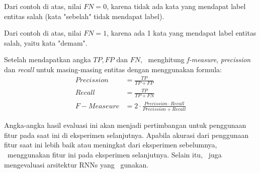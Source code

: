 \begin{enumerate}

	Dari contoh di atas, nilai $ FN = 0 $, karena tidak ada kata yang mendapat label entitas salah (kata "sebelah" tidak mendapat label).
	

	Dari contoh di atas, nilai $ FN = 1 $, karena ada 1 kata yang mendapat label entitas salah, yaitu kata "demam".
	
\end{enumerate}
	
Setelah mendapatkan angka $ TP, FP $ dan $ FN $, \saya~menghitung \textit{f-measure}, \textit{precission} dan \textit{recall} untuk masing-masing entitas dengan menggunakan formula:
\begin{align}
	Precission &= \frac{TP}{TP+FP}\\
	Recall &= \frac{TP}{TP+FN}\\
	F-Measeure &= 2 \cdot \frac{Precission \cdot Recall}{Precission + Recall}
\end{align}

Angka-angka hasil evaluasi ini akan menjadi pertimbangan untuk penggunaan fitur pada saat ini di eksperimen selanjutnya. Apabila akurasi dari penggunaan fitur saat ini lebih baik atau meningkat dari eksperimen sebelumnya, \saya~menggunakan fitur ini pada eksperimen selanjutnya. Selain itu, \saya~juga mengevaluasi arsitektur RNNs yang \saya~gunakan.
	